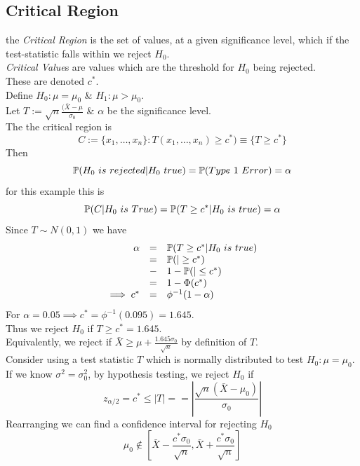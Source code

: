 \documentclass[11pt,a4paper]{article}
\begin{document}
\subsection{Critical Region}

the \textit{Critical Region} is the set of values, at a given significance level, which if the test-statistic falls within we reject $H_0$.\\

\textit{Critical Value}s are values which are the threshold for $H_0$ being rejected.\\
\nb These are denoted $c^*$.\\

Define $H_0:\mu=\mu_0$ \& $H_1:\mu>\mu_0$.\\
Let $T:=\sqrt{n}\frac{(\bar{X}-\mu}{\sigma_0}$ \& $\alpha$ be the significance level.\\
The the critical region is
$$C:=\{x_1,\dots,x_n\}:T(x_1,\dots,x_n)\geq c^*)\equiv\{T\geq c^*\}$$
Then
$$\prob(H_0\ is\ rejected|H_0\ true)=\prob(Type\ 1\ Error)=\alpha$$
for this example this is
$$\prob(C|H_0\ is\ True)=\prob(T\geq c^*|H_0\ is\ true)=\alpha$$
Since $T\sim N(0,1)$ we have
\[\begin{array}{rcl}
\alpha&=&\mathbb{P}(T\geq c^*|H_0\ is\ true)\\
&=&\mathbb{P}(|\geq c^*)\\
&-&1-\mathbb{P}(|\leq c^*)\\
&=&1-\Phi(c^*)\\
\implies c^*&=&\phi^{-1}(1-\alpha)
\end{array}\]
For $\alpha=0.05\implies c^*=\phi^{-1}(0.095)=1.645$.\\
Thus we reject $H_0$ if $T\geq c^*=1.645$.\\
Equivalently, we reject if $\bar{X}\geq\mu+\frac{1.645\sigma_0}{\sqrt{n}}$ by definition of $T$.\\

Consider using a test statistic $T$ which is normally distributed to test $H_0:\mu=\mu_0$.\\
If we know $\sigma^2=\sigma_0^2$, by hypothesis testing, we reject $H_0$ if
$$z_{\alpha/2}=c^*\leq|T|==\left|\dfrac{\sqrt{n}(\bar{X}-\mu_0)}{\sigma_0}\right|$$
Rearranging we can find a confidence interval for rejecting $H_0$
$$\mu_0\not\in\left[\bar{X}-\dfrac{c^*\sigma_0}{\sqrt{n}},\bar{X}+\dfrac{c^*\sigma_0}{\sqrt{n}}\right]$$
\end{document}
